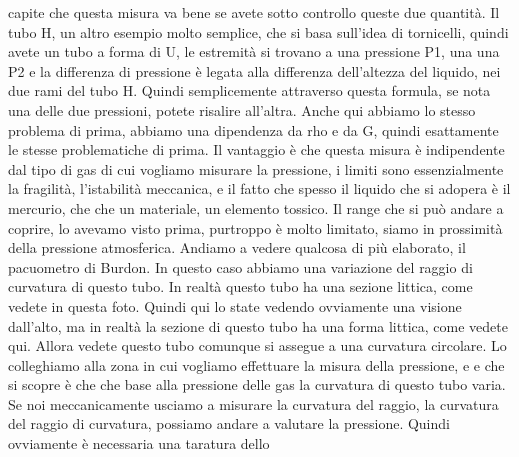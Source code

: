 capite che questa misura va bene se avete sotto controllo queste due quantità. Il tubo H, un altro esempio molto semplice, che si basa sull'idea di tornicelli, quindi avete un tubo a forma di U, le estremità si trovano a una pressione P1, una una P2 e la differenza di pressione è legata alla differenza dell'altezza del liquido, nei due rami del tubo H. Quindi semplicemente attraverso questa formula, se nota una delle due pressioni, potete risalire all'altra. Anche qui abbiamo lo stesso problema di prima, abbiamo una dipendenza da rho e da G, quindi esattamente le stesse problematiche di prima. Il vantaggio è che questa misura è indipendente dal tipo di gas di cui vogliamo misurare la pressione, i limiti sono essenzialmente la fragilità, l'istabilità meccanica, e il fatto che spesso il liquido che si adopera è il mercurio, che che un materiale, un elemento tossico. Il range che si può andare a coprire, lo avevamo visto prima, purtroppo è molto limitato, siamo in prossimità della pressione atmosferica. Andiamo a vedere qualcosa di più elaborato, il pacuometro di Burdon. In questo caso abbiamo una variazione del raggio di curvatura di questo tubo. In realtà questo tubo ha una sezione littica, come vedete in questa foto. Quindi qui lo state vedendo ovviamente una visione dall'alto, ma in realtà la sezione di questo tubo ha una forma littica, come vedete qui. Allora vedete questo tubo comunque si assegue a una curvatura circolare. Lo colleghiamo alla zona in cui vogliamo effettuare la misura della pressione, e e che si scopre è che che base alla pressione delle gas la curvatura di questo tubo varia. Se noi meccanicamente usciamo a misurare la curvatura del raggio, la curvatura del raggio di curvatura, possiamo andare a valutare la pressione. Quindi ovviamente è necessaria una taratura dello 

